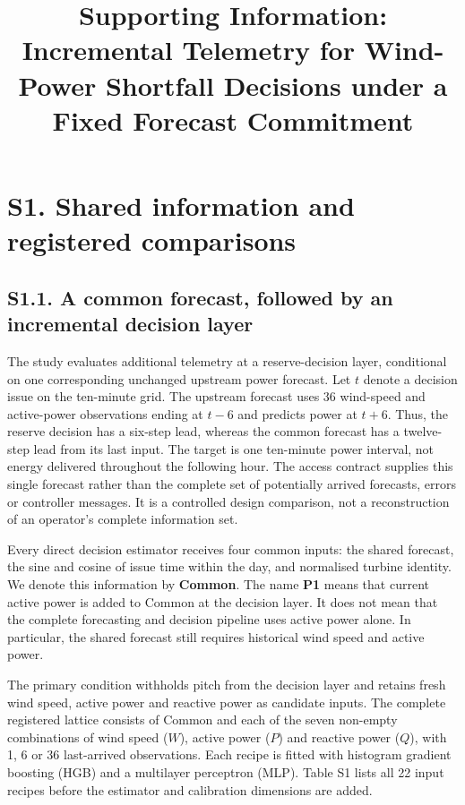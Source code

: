 \documentclass[
  british,
  11pt,
]{article}
\title{Supporting Information: Incremental Telemetry for Wind-Power
Shortfall Decisions under a Fixed Forecast Commitment}
\author{}
\date{}
\begin{document}
\maketitle

\section{S1. Shared information and registered
comparisons}\label{s1.-shared-information-and-registered-comparisons}

\subsection{S1.1. A common forecast, followed by an incremental decision
layer}\label{s1.1.-a-common-forecast-followed-by-an-incremental-decision-layer}

The study evaluates additional telemetry at a reserve-decision layer,
conditional on one corresponding unchanged upstream power forecast. Let
\(t\) denote a decision issue on the ten-minute grid. The upstream
forecast uses 36 wind-speed and active-power observations ending at
\(t-6\) and predicts power at \(t+6\). Thus, the reserve decision has a
six-step lead, whereas the common forecast has a twelve-step lead from
its last input. The target is one ten-minute power interval, not energy
delivered throughout the following hour. The access contract supplies
this single forecast rather than the complete set of potentially arrived
forecasts, errors or controller messages. It is a controlled design
comparison, not a reconstruction of an operator's complete information
set.

Every direct decision estimator receives four common inputs: the shared
forecast, the sine and cosine of issue time within the day, and
normalised turbine identity. We denote this information by
\textbf{Common}. The name \textbf{P1} means that current active power is
added to Common at the decision layer. It does not mean that the
complete forecasting and decision pipeline uses active power alone. In
particular, the shared forecast still requires historical wind speed and
active power.

The primary condition withholds pitch from the decision layer and
retains fresh wind speed, active power and reactive power as candidate
inputs. The complete registered lattice consists of Common and each of
the seven non-empty combinations of wind speed (\(W\)), active power
(\(P\)) and reactive power (\(Q\)), with 1, 6 or 36 last-arrived
observations. Each recipe is fitted with histogram gradient boosting
(HGB) and a multilayer perceptron (MLP). Table S1 lists all 22 input
recipes before the estimator and calibration dimensions are added.
\end{document}
